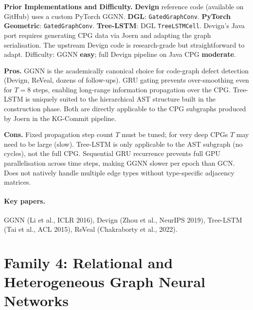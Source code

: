 \documentclass[12pt,a4paper]{article}
\begin{document}
\begin{implbox}
\textbf{Prior Implementations and Difficulty.}
\textbf{Devign} reference code (available on GitHub) uses a custom PyTorch GGNN.
\textbf{DGL}: \texttt{GatedGraphConv}. \textbf{PyTorch Geometric}:
\texttt{GatedGraphConv}. \textbf{Tree-LSTM}: DGL \texttt{TreeLSTMCell}.
Devign's Java port requires generating CPG data via Joern and adapting the graph
serialisation. The upstream Devign code is research-grade but straightforward to
adapt. Difficulty: GGNN \textbf{easy}; full Devign pipeline on Java CPG
\textbf{moderate}.
\end{implbox}

\begin{prosbox}
\textbf{Pros.}
GGNN is the academically canonical choice for code-graph defect detection
(Devign, ReVeal, dozens of follow-ups). GRU gating prevents over-smoothing
even for $T=8$ steps, enabling long-range information propagation over the CPG.
Tree-LSTM is uniquely suited to the hierarchical AST structure built in the
construction phase. Both are directly applicable to the CPG subgraphs produced
by Joern in the KG-Commit pipeline.
\end{prosbox}

\begin{consbox}
\textbf{Cons.}
Fixed propagation step count $T$ must be tuned; for very deep CPGs $T$ may
need to be large (slow). Tree-LSTM is only applicable to the AST subgraph
(no cycles), not the full CPG. Sequential GRU recurrence prevents full GPU
parallelisation across time steps, making GGNN slower per epoch than GCN.
Does not natively handle multiple edge types without type-specific adjacency
matrices.
\end{consbox}

\paragraph{Key papers.} GGNN (Li et al., ICLR 2016), Devign (Zhou et al.,
NeurIPS 2019), Tree-LSTM (Tai et al., ACL 2015), ReVeal (Chakraborty et al., 2022).

\section{Family 4: Relational and Heterogeneous Graph Neural Networks}
\label{sec:rgcn}
\end{document}
